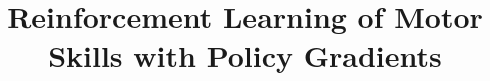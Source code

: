 \newcommand{\ibkt}{\langle\alpha,e_{i}\rangle}
\newcommand{\bla}{\bigl\langle}
\newcommand{\bra}{\bigr\rangle}
\newcommand{\ov}{\overline}
\newcommand{\obkt}{\langle\alpha,e_{1}\rangle}
\newcommand{\abkt}{\langle\alpha,e_{j}\rangle}
\newcommand{\hlf}{\textstyle{\frac{1}{2}}}
\newcommand{\thrd}{\textstyle{\frac{1}{3}}}
\newcommand{\fth}{\textstyle{\frac{1}{5}}}
\newcommand{\sixth}{\textstyle{\frac{1}{6}}}
\newcommand{\norm}[1]{\lVert#1\rVert}
\newcommand{\mbs}{\boldsymbol}
\newcommand{\inv}{\operatorname{inv}}

\renewcommand{\top}{\mathsf{T}}		%
\newcommand{\cop}[1]{\overline{#1}}	%
\newcommand{\hop}{\mathsf{H}}		%
\newcommand{\dop}{\mathsf{\dag}}		%


\theoremheaderfont{\scshape}
\newtheorem{lemma}{Lemma}
\newtheorem{theorem}{Theorem}
\newtheorem{define}{Definition}
\newtheorem{Cor}{Corollary}
\newtheorem{Ass}{Assumption}
\newtheorem{Prop}{Proposition}
\newtheorem{algorithm1}{Algorithm}%
{\theorembodyfont{\rmfamily}
\newtheorem{Rem}{Remark}}
\newtheorem{Obs}{Fact}
\newenvironment{proof}{\noindent{\sc
Proof (Sketch).}\,\,}{\hfill\linebreak[0]\hspace*{\fill}}

\title{\Huge Reinforcement Learning of Motor Skills with Policy Gradients}


